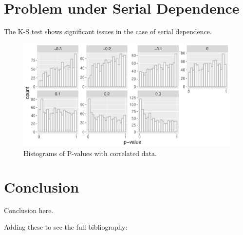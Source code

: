 \documentclass[12pt, letterpaper, titlepage]{article}
\begin{document}
\hypertarget{sec:correlation}{%
\section{Problem under Serial Dependence}\label{sec:correlation}}

The K-S test shows significant issues in the case of serial dependence.

\begin{figure}[!ht]
  \centering
  \includegraphics[scale=0.7]{hist_correlation}
  \caption{Histograms of P-values with correlated data.}
  \label{fig:hist_correlation}
\end{figure}

\hypertarget{sec:conclusion}{%
\section{Conclusion}\label{sec:conclusion}}

Conclusion here.

Adding these to see the full bibliography: 

\citet{Steinskog}
\citet{Weiss}
\citet{Massey}
\citet{Lilliefors}
\citet{dgof}
\citet{Conover}
\citet{Gleser}



\end{document}
